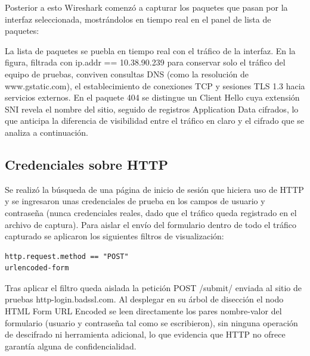 Posterior a esto Wireshark comenzó a capturar los paquetes que pasan por la interfaz seleccionada, mostrándolos en tiempo real en el panel de lista de paquetes:


\begin{analisis}


La lista de paquetes se puebla en tiempo real con el tráfico de la interfaz. En la figura, filtrada con ip.addr == 10.38.90.239 para conservar solo el tráfico del equipo de pruebas, conviven consultas DNS (como la resolución de www.gstatic.com), el establecimiento de conexiones TCP y sesiones TLS 1.3 hacia servicios externos. En el paquete 404 se distingue un Client Hello cuya extensión SNI revela el nombre del sitio, seguido de registros Application Data cifrados, lo que anticipa la diferencia de visibilidad entre el tráfico en claro y el cifrado que se analiza a continuación.
\end{analisis}

\subsection{Credenciales sobre HTTP}

Se realizó la búsqueda de una página de inicio de sesión que hiciera uso de HTTP y se ingresaron unas credenciales de prueba en los campos de usuario y contraseña (nunca credenciales reales, dado que el tráfico queda registrado en el archivo de captura). Para aislar el envío del formulario dentro de todo el tráfico capturado se aplicaron los siguientes filtros de visualización:

\begin{lstlisting}
http.request.method == "POST"
urlencoded-form
\end{lstlisting}


\begin{analisis}


Tras aplicar el filtro queda aislada la petición POST /submit/ enviada al sitio de pruebas http-login.badssl.com. Al desplegar en su árbol de disección el nodo HTML Form URL Encoded se leen directamente los pares nombre-valor del formulario (usuario y contraseña tal como se escribieron), sin ninguna operación de descifrado ni herramienta adicional, lo que evidencia que HTTP no ofrece garantía alguna de confidencialidad.
\end{analisis}

